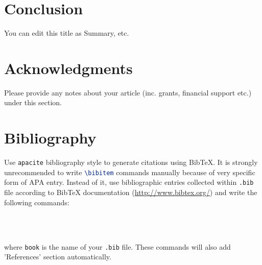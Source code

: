 \documentclass{flossiner}
\begin{document}
\section{Conclusion}
You can edit this title as Summary, etc.


\section{Acknowledgments}
Please provide any notes about your article (inc. grants, financial support etc.) under this section.

\section{Bibliography}
Use \texttt{apacite} bibliography style to generate citations using BibTeX. It is strongly unrecommended to write \lstinline[language=TeX]|\bibitem| commands manually because of very specific form of APA entry. Instead of it, use bibliographic entries collected within \texttt{.bib} file according to BibTeX documentation (\href{http://www.bibtex.org/}{http://www.bibtex.org/}) and write the following commands:
\begin{lstlisting}[language=TeX,caption={Adding a bibliography}]
	
	
\end{lstlisting}
where \texttt{book} is the name of your \texttt{.bib} file. These commands will also add 'References' section automatically.
\end{document}
